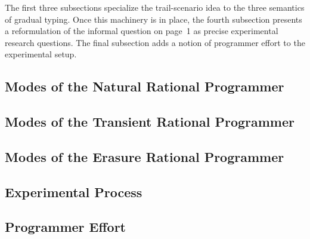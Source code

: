 
The first three subsections specialize the trail-scenario idea to the
three semantics of gradual typing. Once this machinery is in place,
the fourth subsection presents a reformulation of the informal
question on page~1 as precise experimental research questions. The
final subsection adds a notion of programmer effort to the
experimental setup. 

\def\rsub#1#2{\subsection{#2} \label{sub:#1} }

\rsub{natural}   {Modes of the Natural Rational Programmer} 
\rsub{transient} {Modes of the Transient Rational Programmer} 
\rsub{erasure}   {Modes of the Erasure Rational Programmer} 
\rsub{experiment}{Experimental Process} 
\rsub{effort}    {Programmer Effort} \label{subsec:effort}
